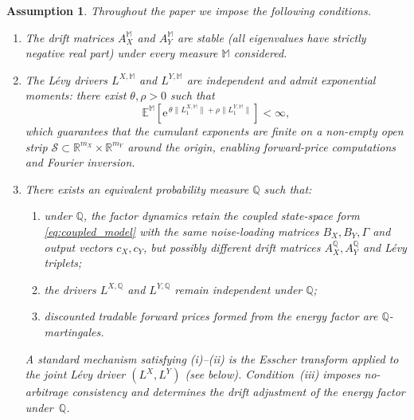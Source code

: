 \documentclass[10pt,a4paper,reqno]{amsart}
\newtheorem{assumption}[theorem]{Assumption}
\newcommand{\R}{\mathbb{R}}
\newcommand{\Q}{\mathbb{Q}}
\newcommand{\1}{\mathbbm{1}}
\newcommand{\ee}{\mathrm{e}}
\begin{document}
\begin{assumption}\label{ass:coupled_model}
Throughout the paper we impose the following conditions.
\begin{enumerate}[label=(\alph*)]
  \item\label{ass:stability} The drift matrices $A_X^{\mathbb{M}}$ and
    $A_Y^{\mathbb{M}}$ are stable (all eigenvalues have strictly negative real
    part) under every measure $\mathbb{M}$ considered.
  \item\label{ass:moments} The Lévy drivers $L^{X,\mathbb{M}}$ and
    $L^{Y,\mathbb{M}}$ are independent and admit exponential moments: there
    exist $\theta, \rho > 0$ such that
    $$
      \mathbb{E}^{\mathbb{M}}\!\left[
        \ee^{\,\theta\|L_1^{X,\mathbb{M}}\| + \rho\|L_1^{Y,\mathbb{M}}\|}
      \right] < \infty,
    $$
    which guarantees that the cumulant exponents are finite on a non-empty open
    strip $\mathcal{S} \subset \R^{m_X} \times \R^{m_Y}$ around the origin,
    enabling forward-price computations and Fourier inversion.
  \item\label{ass:pricing_measure_main} There exists an equivalent probability
    measure $\Q$ such that:
    \begin{enumerate}[label=(\roman*)]
      \item under $\Q$, the factor dynamics retain the coupled state-space form
        \eqref{eq:coupled_model} with the same noise-loading matrices $B_X,
        B_Y, \Gamma$ and output vectors $c_X, c_Y$, but possibly different
        drift matrices $A_X^\Q, A_Y^\Q$ and Lévy triplets;
      \item the drivers $L^{X,\Q}$ and $L^{Y,\Q}$ remain independent under
        $\Q$;
      \item discounted tradable forward prices formed from the energy factor are
        $\Q$-martingales.
    \end{enumerate}
    A standard mechanism satisfying (i)--(ii) is the Esscher transform applied
    to the joint Lévy driver $(L^X,L^Y)$ (see 
    below). Condition~(iii) imposes no-arbitrage consistency and determines the
    drift adjustment of the energy factor under~$\Q$.
\end{enumerate}
\end{assumption}
\end{document}
